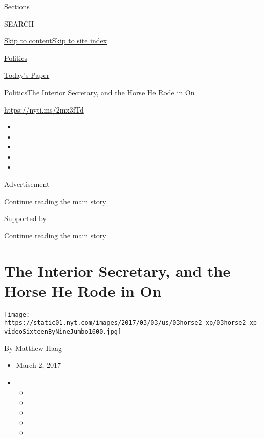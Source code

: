 Sections

SEARCH

\protect\hyperlink{site-content}{Skip to
content}\protect\hyperlink{site-index}{Skip to site index}

\href{https://www.nytimes.com/section/politics}{Politics}

\href{https://myaccount.nytimes.com/auth/login?response_type=cookie\&client_id=vi}{}

\href{https://www.nytimes.com/section/todayspaper}{Today's Paper}

\href{/section/politics}{Politics}\textbar{}The Interior Secretary, and
the Horse He Rode in On

\url{https://nyti.ms/2mx3fTd}

\begin{itemize}
\item
\item
\item
\item
\item
\end{itemize}

Advertisement

\protect\hyperlink{after-top}{Continue reading the main story}

Supported by

\protect\hyperlink{after-sponsor}{Continue reading the main story}

\hypertarget{the-interior-secretary-and-the-horse-he-rode-in-on}{%
\section{The Interior Secretary, and the Horse He Rode in
On}\label{the-interior-secretary-and-the-horse-he-rode-in-on}}

\texttt{[image: https://static01.nyt.com/images/2017/03/03/us/03horse2\_xp/03horse2\_xp-videoSixteenByNineJumbo1600.jpg]}

By \href{https://www.nytimes.com/by/matthew-haag}{Matthew Haag}

\begin{itemize}
\item
  March 2, 2017
\item
  \begin{itemize}
  \item
  \item
  \item
  \item
  \item
  \end{itemize}
\end{itemize}

